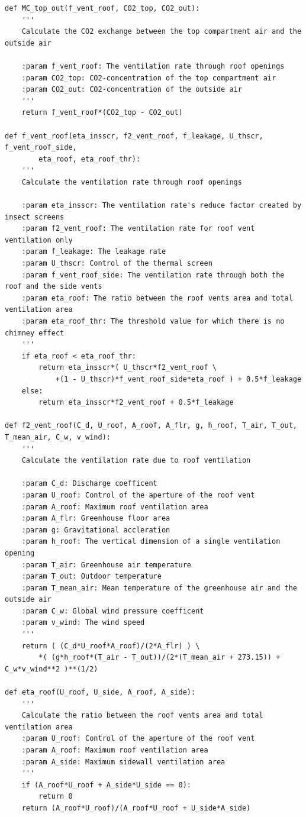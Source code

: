 \documentclass[a4paper]{article}
\begin{document}
\begin{appendices}
\begin{verbatim}
def MC_top_out(f_vent_roof, CO2_top, CO2_out):
    '''
    Calculate the CO2 exchange between the top compartment air and the outside air

    :param f_vent_roof: The ventilation rate through roof openings
    :param CO2_top: CO2-concentration of the top compartment air
    :param CO2_out: CO2-concentration of the outside air
    '''
    return f_vent_roof*(CO2_top - CO2_out)

def f_vent_roof(eta_insscr, f2_vent_roof, f_leakage, U_thscr, f_vent_roof_side,
        eta_roof, eta_roof_thr):
    '''
    Calculate the ventilation rate through roof openings

    :param eta_insscr: The ventilation rate's reduce factor created by insect screens
    :param f2_vent_roof: The ventilation rate for roof vent ventilation only
    :param f_leakage: The leakage rate
    :param U_thscr: Control of the thermal screen
    :param f_vent_roof_side: The ventilation rate through both the roof and the side vents
    :param eta_roof: The ratio between the roof vents area and total ventilation area
    :param eta_roof_thr: The threshold value for which there is no chimney effect
    '''
    if eta_roof < eta_roof_thr:
        return eta_insscr*( U_thscr*f2_vent_roof \
            +(1 - U_thscr)*f_vent_roof_side*eta_roof ) + 0.5*f_leakage
    else:
        return eta_insscr*f2_vent_roof + 0.5*f_leakage

def f2_vent_roof(C_d, U_roof, A_roof, A_flr, g, h_roof, T_air, T_out, T_mean_air, C_w, v_wind):
    '''
    Calculate the ventilation rate due to roof ventilation

    :param C_d: Discharge coefficent
    :param U_roof: Control of the aperture of the roof vent
    :param A_roof: Maximum roof ventilation area
    :param A_flr: Greenhouse floor area
    :param g: Gravitational accleration
    :param h_roof: The vertical dimension of a single ventilation opening
    :param T_air: Greenhouse air temperature
    :param T_out: Outdoor temperature
    :param T_mean_air: Mean temperature of the greenhouse air and the outside air
    :param C_w: Global wind pressure coefficent
    :param v_wind: The wind speed
    '''
    return ( (C_d*U_roof*A_roof)/(2*A_flr) ) \
        *( (g*h_roof*(T_air - T_out))/(2*(T_mean_air + 273.15)) + C_w*v_wind**2 )**(1/2)

def eta_roof(U_roof, U_side, A_roof, A_side):
    '''
    Calculate the ratio between the roof vents area and total ventilation area
    :param U_roof: Control of the aperture of the roof vent
    :param A_roof: Maximum roof ventilation area
    :param A_side: Maximum sidewall ventilation area
    '''
    if (A_roof*U_roof + A_side*U_side == 0):
        return 0
    return (A_roof*U_roof)/(A_roof*U_roof + U_side*A_side) 


\end{verbatim}
\end{appendices}
\end{document}

